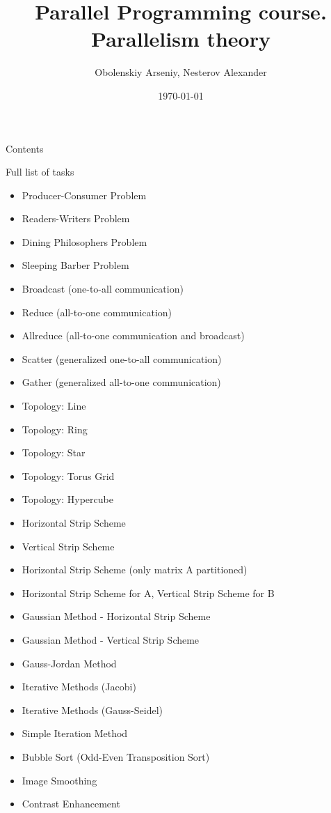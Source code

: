 \documentclass{beamer}
\title[Parallel Programming. Parallelism theory]{Parallel Programming course. Parallelism theory}
\author{Obolenskiy Arseniy, Nesterov Alexander}
\institute{Nizhny Novgorod State University}
\date{\today} %
\begin{document}
\begin{frame}
    \titlepage
\end{frame}

\begin{frame}{Contents}
    \tableofcontents
\end{frame}

\begin{frame}{Full list of tasks}
  \tiny
  \begin{itemize}
    \item Producer-Consumer Problem
    \item Readers-Writers Problem
    \item Dining Philosophers Problem
    \item Sleeping Barber Problem
    \item Broadcast (one-to-all communication)
    \item Reduce (all-to-one communication)
    \item Allreduce (all-to-one communication and broadcast)
    \item Scatter (generalized one-to-all communication)
    \item Gather (generalized all-to-one communication)
    \item Topology: Line
    \item Topology: Ring
    \item Topology: Star
    \item Topology: Torus Grid
    \item Topology: Hypercube
    \item Horizontal Strip Scheme
    \item Vertical Strip Scheme
    \item Horizontal Strip Scheme (only matrix A partitioned)
    \item Horizontal Strip Scheme for A, Vertical Strip Scheme for B
    \item Gaussian Method - Horizontal Strip Scheme
    \item Gaussian Method - Vertical Strip Scheme
    \item Gauss-Jordan Method
    \item Iterative Methods (Jacobi)
    \item Iterative Methods (Gauss-Seidel)
    \item Simple Iteration Method
    \item Bubble Sort (Odd-Even Transposition Sort)
    \item Image Smoothing
    \item Contrast Enhancement
  \end{itemize}
\end{frame}
\end{document}
